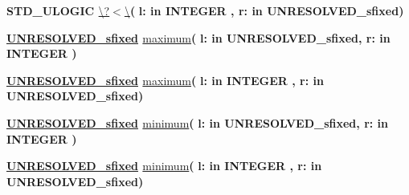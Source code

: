 \begin{DoxyCompactItemize}
\item 
{\bfseries {\bfseries \textcolor{comment}{S\+T\+D\+\_\+\+U\+L\+O\+G\+I\+C}\textcolor{vhdlchar}{ }}} \hyperlink{classfixed__pkg_a7e98e66a4a282c529968f69f70dd16ad}{\textbackslash{}?$<$\textbackslash{}}{\bfseries  ( }{\bfseries \textcolor{vhdlchar}{l\+: }\textcolor{stringliteral}{in }{\bfseries \textcolor{comment}{I\+N\+T\+E\+G\+E\+R}\textcolor{vhdlchar}{ }}}{\bfseries  , \textcolor{vhdlchar}{r\+: }\textcolor{stringliteral}{in }\textcolor{vhdlchar}{U\+N\+R\+E\+S\+O\+L\+V\+E\+D\+\_\+sfixed}}{\bfseries  )} 
\item 
{\bfseries {\bfseries {\bfseries \hyperlink{classfixed__pkg_aa723b28a027c3c0f9bca02d75e8df4d6}{U\+N\+R\+E\+S\+O\+L\+V\+E\+D\+\_\+sfixed}} \textcolor{vhdlchar}{ }}} \hyperlink{classfixed__pkg_a427ed4c94126ca4966f81712b325a314}{maximum}{\bfseries  ( }{\bfseries \textcolor{vhdlchar}{l\+: }\textcolor{stringliteral}{in }\textcolor{vhdlchar}{U\+N\+R\+E\+S\+O\+L\+V\+E\+D\+\_\+sfixed}}{\bfseries  , \textcolor{vhdlchar}{r\+: }\textcolor{stringliteral}{in }{\bfseries \textcolor{comment}{I\+N\+T\+E\+G\+E\+R}\textcolor{vhdlchar}{ }}}{\bfseries  )} 
\item 
{\bfseries {\bfseries {\bfseries \hyperlink{classfixed__pkg_aa723b28a027c3c0f9bca02d75e8df4d6}{U\+N\+R\+E\+S\+O\+L\+V\+E\+D\+\_\+sfixed}} \textcolor{vhdlchar}{ }}} \hyperlink{classfixed__pkg_a427ed4c94126ca4966f81712b325a314}{maximum}{\bfseries  ( }{\bfseries \textcolor{vhdlchar}{l\+: }\textcolor{stringliteral}{in }{\bfseries \textcolor{comment}{I\+N\+T\+E\+G\+E\+R}\textcolor{vhdlchar}{ }}}{\bfseries  , \textcolor{vhdlchar}{r\+: }\textcolor{stringliteral}{in }\textcolor{vhdlchar}{U\+N\+R\+E\+S\+O\+L\+V\+E\+D\+\_\+sfixed}}{\bfseries  )} 
\item 
{\bfseries {\bfseries {\bfseries \hyperlink{classfixed__pkg_aa723b28a027c3c0f9bca02d75e8df4d6}{U\+N\+R\+E\+S\+O\+L\+V\+E\+D\+\_\+sfixed}} \textcolor{vhdlchar}{ }}} \hyperlink{classfixed__pkg_ac6e7f426014fe929a97c17a175463b51}{minimum}{\bfseries  ( }{\bfseries \textcolor{vhdlchar}{l\+: }\textcolor{stringliteral}{in }\textcolor{vhdlchar}{U\+N\+R\+E\+S\+O\+L\+V\+E\+D\+\_\+sfixed}}{\bfseries  , \textcolor{vhdlchar}{r\+: }\textcolor{stringliteral}{in }{\bfseries \textcolor{comment}{I\+N\+T\+E\+G\+E\+R}\textcolor{vhdlchar}{ }}}{\bfseries  )} 
\item 
{\bfseries {\bfseries {\bfseries \hyperlink{classfixed__pkg_aa723b28a027c3c0f9bca02d75e8df4d6}{U\+N\+R\+E\+S\+O\+L\+V\+E\+D\+\_\+sfixed}} \textcolor{vhdlchar}{ }}} \hyperlink{classfixed__pkg_ac6e7f426014fe929a97c17a175463b51}{minimum}{\bfseries  ( }{\bfseries \textcolor{vhdlchar}{l\+: }\textcolor{stringliteral}{in }{\bfseries \textcolor{comment}{I\+N\+T\+E\+G\+E\+R}\textcolor{vhdlchar}{ }}}{\bfseries  , \textcolor{vhdlchar}{r\+: }\textcolor{stringliteral}{in }\textcolor{vhdlchar}{U\+N\+R\+E\+S\+O\+L\+V\+E\+D\+\_\+sfixed}}{\bfseries  )} 

\end{DoxyCompactItemize}
